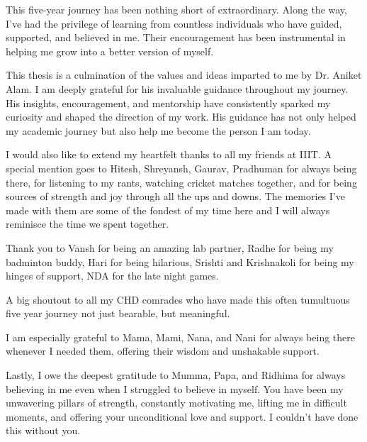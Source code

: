 This five-year journey has been nothing short of extraordinary. Along the way, I’ve had the privilege of learning from countless individuals who have guided, supported, and believed in me. Their encouragement has been instrumental in helping me grow into a better version of myself.

This thesis is a culmination of the values and ideas imparted to me by Dr. Aniket Alam. I am deeply grateful for his invaluable guidance throughout my journey. His insights, encouragement, and  mentorship have consistently sparked my curiosity and shaped the direction of my work. His guidance has not only helped my academic journey but also help me become the person I am today.

I would also like to extend my heartfelt thanks to all my friends at IIIT. A special mention goes to Hitesh, Shreyansh, Gaurav, Pradhuman for always being there, for listening to my rants, watching cricket matches together, and for being sources of strength and joy through all the ups and downs. The memories I’ve made with them are some of the fondest of my time here and I will always reminisce the time we spent together.

Thank you to Vansh for being an amazing lab partner, Radhe for being my badminton buddy, Hari for being hilarious, Srishti and Krishnakoli for being my hinges of support,  NDA for the late night games.

A big shoutout to all my CHD comrades who have made this often tumultuous five year journey not just bearable, but meaningful.

I am especially grateful to Mama, Mami, Nana, and Nani for always being there whenever I needed them, offering their wisdom and unshakable support.

Lastly, I owe the deepest gratitude to Mumma, Papa, and Ridhima for always believing in me even when I struggled to believe in myself. You have been my unwavering pillars of strength, constantly motivating me, lifting me in difficult moments, and offering your unconditional love and support. I couldn’t have done this without you.
